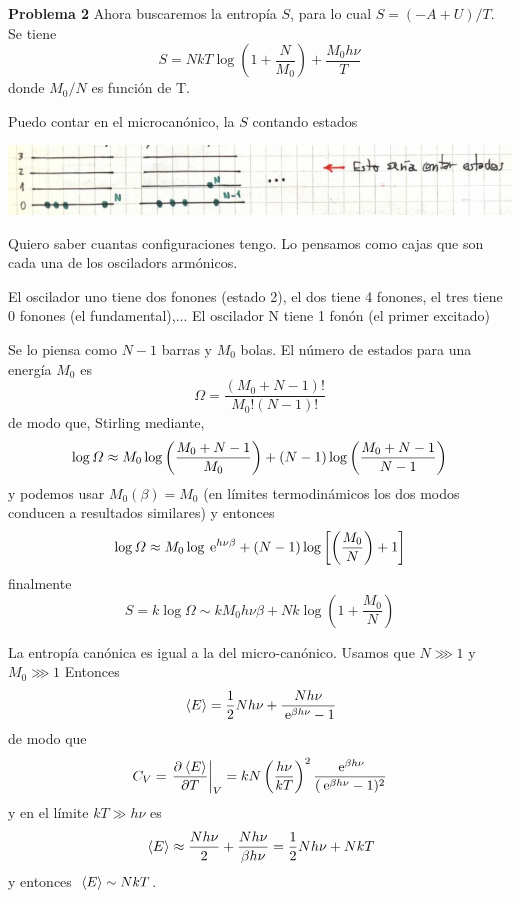 \documentclass[10pt,oneside]{CBFT_book}
\begin{document}
\begin{ejemplo}{\bf Problema 2}
Ahora buscaremos la entropía $S$, para lo cual $S = (- A + U ) / T $. Se tiene
\[
	S = N k T \log \left( 1 + \frac{N}{M_0} \right) + \frac{M_0 h \nu }{T}
\]
donde $M_0/N$ es función de T.

Puedo contar en el microcanónico, la $S$ contando estados

\includegraphics[scale=0.5]{images/1606329418.jpg} 

Quiero saber cuantas configuraciones tengo. Lo pensamos como cajas que son 
cada una de los osciladors armónicos.

El oscilador uno tiene dos fonones (estado 2), el dos tiene 4 fonones, el tres
tiene 0 fonones (el fundamental),...
El oscilador N tiene 1 fonón (el primer excitado)

Se lo piensa como $N-1$ barras y $M_0$ bolas. El número de estados para una energía $M_0$ es
\[
	\Omega = \frac{(M_0+N-1)!}{ M_0!(N-1)!}
\]
de modo que, Stirling mediante,
\[
	\log \Omega \approx M_0 \log \left( \frac{ M_0+N-1 }{ M_0 } \right) + (N-1)\log \left( \frac{ M_0+N-1 }{ N-1 } \right)
\]
y podemos usar $M_0( \beta)=M_0$ (en límites termodinámicos los dos modos conducen a
resultados similares) y entonces
\[
	\log \Omega \approx M_0 \log \:\mathrm{e}^{ h \nu \beta } + (N-1)\log \left[ \left( \frac{ M_0 }{ N } \right) + 1 \right]
\]
finalmente
\[
	S = k \log \Omega \sim k M_0 h \nu \beta + N k \log \left( 1 + \frac {M_0} N \right)
\]

La entropía canónica es igual a la del micro-canónico. Usamos que $N \ggg 1$ y $M_0 \ggg 1$
Entonces
\[
	 \:\left\langle E \right\rangle = \frac{1}{2} N h \nu + \frac{ N h \nu }{ \:\mathrm{e}^{ \beta h \nu } - 1 }
\]
de modo que 
\[
	C_V = \left.\frac{\partial^{\hspace{-0.05em}} {\:\left\langle E \right\rangle}}{\partial {T}^{\hspace{-0.05em}}}\right|_{V} = k N \left( \frac{ h\nu }{ kT } \right)^2 \frac{\:\mathrm{e}^{\beta h \nu}}{(\:\mathrm{e}^{\beta h \nu}-1)^2}
\]
y en el límite $ k T \gg h \nu $ es
\[
	\:\left\langle E \right\rangle \approx \frac{ N h \nu }{2} + \frac{ N h \nu }{ \beta h \nu } = \frac{1}{2} N h \nu + N k T
\]
y entonces $\:\left\langle E \right\rangle \sim NkT$.

\end{ejemplo}
\end{document}
